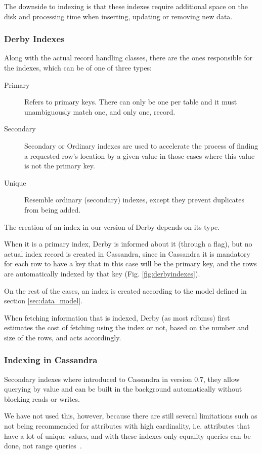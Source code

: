 The downside to indexing is that these indexes require additional space on the disk and processing time when inserting, updating or removing new data.

\subsubsection{Derby Indexes}
Along with the actual record handling classes, there are the ones responsible for the indexes, which can be of one of three types:

\begin{description}
	\item[Primary] Refers to primary keys. There can only be one per table and it must unambiguously match one, and only one, record.
	\item[Secondary] Secondary or Ordinary indexes are used to accelerate the process of finding a requested row's location by a given value in those cases where this value is not the primary key. 
	\item[Unique] Resemble ordinary (secondary) indexes, except they prevent duplicates from being added.	
\end{description} 

The creation of an index in our version of Derby depends on its type. 

When it is a primary index, Derby is informed about it (through a flag), but no actual index record is created in Cassandra, since in Cassandra it is mandatory for each row to have a key that in this case will be the primary key, and the rows are automatically indexed by that key (Fig. \ref{fig:derbyindexes}).

On the rest of the cases, an index is created according to the model defined in section \ref{sec:data_model}.

When fetching information that is indexed, Derby (as most \acp{rdbms}) first estimates the cost of fetching using the index or not, based on the number and size of the rows, and acts accordingly.

\subsubsection{Indexing in Cassandra}
Secondary indexes where introduced to Cassandra in version 0.7, they allow querying by value and can be built in the background automatically without blocking reads or writes. 

We have not used this, however, because there are still several limitations such as not being recommended for attributes with high cardinality, i.e. attributes that have a lot of unique values, and with these indexes only equality queries can be done, not range queries~\cite{secindexlimitations}.

